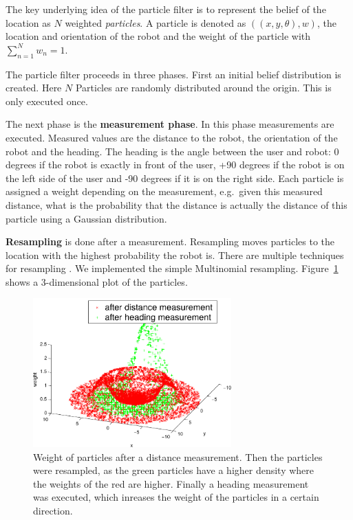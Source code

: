 \documentclass[journal]{IEEEtran}
\let\MYoriglatexcaption\caption
\renewcommand{\caption}[2][\relax]{\MYoriglatexcaption[#2]{#2}}
\begin{document}
The key underlying idea of the particle filter is to represent the belief
of the location as $N$ weighted \emph{particles}. A particle is denoted as
$((x,y,\theta),w)$, the location and orientation of the robot and
the weight of the particle with $\sum_{n=1}^N w_n = 1$.

The particle filter proceeds in three phases. First an initial belief
distribution is created. Here $N$ Particles are randomly distributed around the
origin. This is only executed once.

The next phase is the \textbf{measurement phase}. In this phase measurements
are executed. Measured values are the distance to the robot, the orientation of
the robot and the heading. The heading is the angle between the user and robot:
0 degrees if the robot is exactly in front of the user, +90 degrees if the
robot is on the left side of the user and -90 degrees if it is on the right
side. Each particle is assigned a weight depending on the measurement, e.g.\
given this measured distance, what is the probability that the distance is
actually the distance of this particle using a Gaussian distribution.

\textbf{Resampling} is done after a measurement. Resampling moves particles
to the location with the highest probability the robot is. There are multiple
techniques for resampling \cite{douc2005comparison}. We implemented the
simple Multinomial resampling. Figure~\ref{fig:particle-measurement} shows a
3-dimensional plot of the particles.

\begin{figure}[!htpb]
 \centering
 \includegraphics[width=3in]{images/particle-measure.pdf}
 \caption{Weight of particles after a distance measurement. Then the particles
 were resampled, as the green particles have a higher density where the weights
of the red are higher. Finally a heading measurement was executed, which
inreases the weight of the particles in a certain direction.}
 \label{fig:particle-measurement}
\end{figure}
\end{document}
